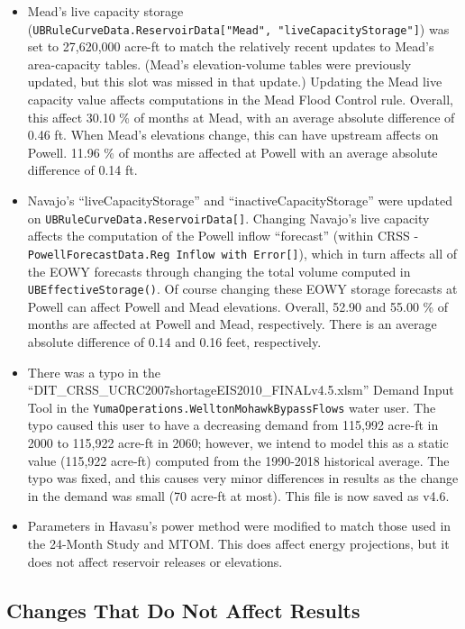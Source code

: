 \documentclass[
]{article}
\providecommand{\tightlist}{%
  \setlength{\itemsep}{0pt}\setlength{\parskip}{0pt}}
\begin{document}
\begin{itemize}
\tightlist
\item
  Mead's live capacity storage
  (\texttt{UBRuleCurveData.ReservoirData{[}"Mead",\ "liveCapacityStorage"{]}})
  was set to 27,620,000 acre-ft to match the relatively recent updates
  to Mead's area-capacity tables. (Mead's elevation-volume tables were
  previously updated, but this slot was missed in that update.) Updating
  the Mead live capacity value affects computations in the Mead Flood
  Control rule. Overall, this affect 30.10 \% of months at Mead, with an
  average absolute difference of 0.46 ft. When Mead's elevations change,
  this can have upstream affects on Powell. 11.96 \% of months are
  affected at Powell with an average absolute difference of 0.14 ft.
\item
  \raggedright Navajo's ``liveCapacityStorage'' and
  ``inactiveCapacityStorage'' were updated on
  \texttt{UBRuleCurveData.ReservoirData{[}{]}}. Changing Navajo's live
  capacity affects the computation of the Powell inflow ``forecast''
  (within CRSS -
  \texttt{PowellForecastData.Reg\ Inflow\ with\ Error{[}{]}}), which in
  turn affects all of the EOWY forecasts through changing the total
  volume computed in \texttt{UBEffectiveStorage()}. Of course changing
  these EOWY storage forecasts at Powell can affect Powell and Mead
  elevations. Overall, 52.90 and 55.00 \% of months are affected at
  Powell and Mead, respectively. There is an average absolute difference
  of 0.14 and 0.16 feet, respectively.
\item
  There was a typo in the
  ``DIT\_CRSS\_UCRC2007shortageEIS2010\_FINALv4.5.xlsm'' Demand Input
  Tool in the \texttt{YumaOperations.WelltonMohawkBypassFlows} water
  user. The typo caused this user to have a decreasing demand from
  115,992 acre-ft in 2000 to 115,922 acre-ft in 2060; however, we intend
  to model this as a static value (115,922 acre-ft) computed from the
  1990-2018 historical average. The typo was fixed, and this causes very
  minor differences in results as the change in the demand was small (70
  acre-ft at most). This file is now saved as v4.6.
\item
  Parameters in Havasu's power method were modified to match those used
  in the 24-Month Study and MTOM. This does affect energy projections,
  but it does not affect reservoir releases or elevations.
\end{itemize}

\hypertarget{changes-that-do-not-affect-results}{%
\subsection{Changes That Do Not Affect
Results}\label{changes-that-do-not-affect-results}}
\end{document}
